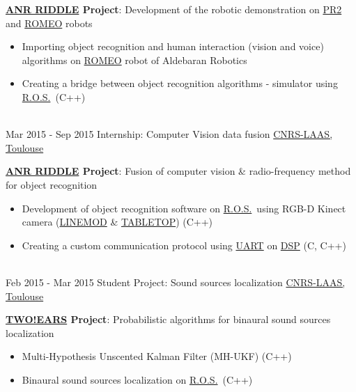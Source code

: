 \documentclass[letterpaper]{twentysecondcv} %
\newcommand{\ros}{\href{http://www.ros.org/}{R.O.S.}}
\begin{document}
\begin{twenty}
  {
    \textbf{\href{http://www.agence-nationale-recherche.fr/Project-ANR-12-CORD-0003}{ANR
        RIDDLE} Project}: Development of the robotic demonstration on
    \href{http://www.willowgarage.com/pages/pr2/overview}{PR2} and
    \href{https://spectrum.ieee.org/automaton/robotics/humanoids/aldebaran-robotics-introduces-romeo-finally}{ROMEO} robots
    \begin{itemize}
    \item Importing object recognition and human interaction (vision and voice)
      algorithms on
      \href{https://spectrum.ieee.org/automaton/robotics/humanoids/aldebaran-robotics-introduces-romeo-finally}{ROMEO}
      robot of Aldebaran Robotics
    \item Creating a bridge between object recognition algorithms - simulator
      using \ros\ (C++)
    \end{itemize}
  }
  \\
  \twentyitem
  {Mar 2015 -}
  {Sep 2015}
  {Internship: Computer Vision data fusion}
  {\href{https://www.laas.fr/public/en}{CNRS-LAAS, Toulouse}}
  {
    \textbf{\href{http://www.agence-nationale-recherche.fr/Project-ANR-12-CORD-0003}{ANR
        RIDDLE} Project}: Fusion of computer vision \& radio-frequency method for
    object recognition
    \begin{itemize}
    \item Development of object recognition software on \ros\ using RGB-D
      Kinect camera
      (\href{http://www.stefan-hinterstoisser.com/papers/hinterstoisser2011linemod.pdf}{LINEMOD}
      \& \href{http://wiki.ros.org/tabletop_object_detector}{TABLETOP}) (C++)
    \item Creating a custom communication protocol using
      \href{https://en.wikipedia.org/wiki/Universal_asynchronous_receiver-transmitter}{UART}
      on \href{https://en.wikipedia.org/wiki/Digital_signal_processor}{DSP} (C, C++)
    \end{itemize}
  }
  \\
  \twentyitem
  {Feb 2015 -}
  {Mar 2015}
  {Student Project: Sound sources localization}
  {\href{https://www.laas.fr/public/en}{CNRS-LAAS, Toulouse}}
  {
    \textbf{\href{http://twoears.eu/}{TWO!EARS} Project}: Probabilistic
    algorithms for binaural sound sources localization
    \begin{itemize}
    \item Multi-Hypothesis Unscented Kalman Filter (MH-UKF) (C++)
    \item Binaural sound sources localization on \ros\ (C++)

\end{itemize}}
\end{twenty}
\end{document}
